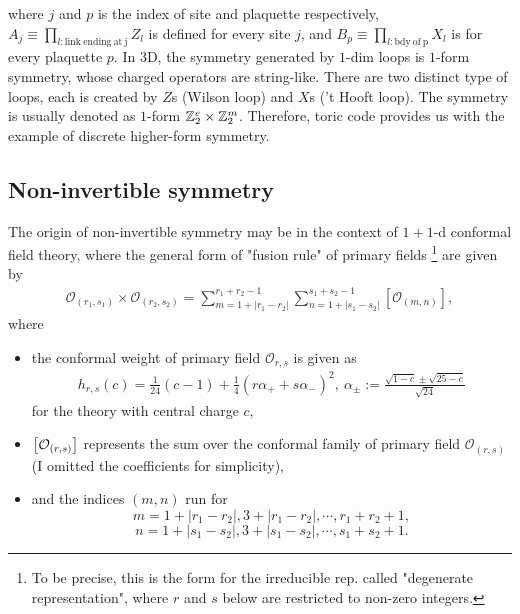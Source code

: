 \documentclass{ltjsarticle}
\theoremstyle{mystyle} %
\numberwithin{equation}{section}
\begin{document}
where $j$ and $p$ is the index of site and plaquette respectively, 
$A_{j}\equiv \prod_{l:\mathrm{link~ending~at~j}} Z_l$ is defined for every site $j$, 
and $B_{p}\equiv \prod_{l:\mathrm{bdy~of~p}} X_l$ is for every plaquette $p$. 
In 3D, the symmetry generated by $1$-dim loops is $1$-form symmetry, whose charged operators are string-like. 
There are two distinct type of loops, each is created by $Z$s (Wilson loop) and $X$s ('t Hooft loop). 
The symmetry is usually denoted as $1$-form $\mathbb{Z}^{e}_2\times \mathbb{Z}^{m}_{2}$. 
Therefore, toric code provides us with the example of discrete higher-form symmetry. 
\subsection{Non-invertible symmetry}
The origin of non-invertible symmetry may be in the context of $1+1$-d conformal field theory, 
where the general form of "fusion rule" of primary fields
\footnote{To be precise, this is the form for the irreducible rep. called "degenerate representation", where 
$r$ and $s$ below are restricted to non-zero integers. } 
are given by
\begin{align}
    \mathcal{O}_{(r_1, s_1)}\times \mathcal{O}_{(r_2, s_2)}
    =\sum_{m=1+|r_1-r_2|}^{r_1 + r_2 -1}\sum_{n=1+|s_1-s_2|}^{s_1 + s_2 -1}
    [\mathcal{O}_{(m,n)}], 
\label{fusionCFT}
\end{align}
where
\begin{itemize}
    \item the conformal weight of primary field $\mathcal{O}_{r,s}$ is given as
    \begin{align}
        h_{r,s}(c) = \frac{1}{24}(c-1) + \frac{1}{4}(r\alpha_+ + s\alpha_{-})^2, ~
        \alpha_{\pm} := \frac{\sqrt{1-c}\pm\sqrt{25-c}}{\sqrt{24}}
    \end{align}
    for the theory with central charge $c$, 
    \item $\left[{\mathcal{O}_{(r,s)}}\right]$ represents the sum over the conformal family of primary field $\mathcal{O}_{(r,s)}$ 
    (I omitted the coefficients for simplicity), 
    \item and the indices $(m, n)$ run for 
    $$m=1+|r_1-r_2|, 3+|r_1-r_2|, \cdots, r_1+r_2+1,$$
    $$n=1+|s_1-s_2|, 3+|s_1-s_2|, \cdots, s_1 + s_2+1. $$
\end{itemize}
\end{document}
